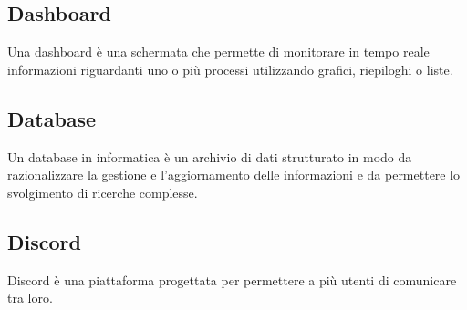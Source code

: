 
\subsection*{Dashboard}
Una dashboard è una schermata che permette di monitorare in tempo reale informazioni riguardanti uno o più processi utilizzando grafici, riepiloghi o liste. 

\subsection*{Database}
Un database in informatica è un archivio di dati strutturato in modo da razionalizzare la gestione e l'aggiornamento delle informazioni e da permettere lo svolgimento di ricerche complesse.

\subsection*{Discord}
Discord è una piattaforma progettata per permettere a più utenti di comunicare tra loro.

